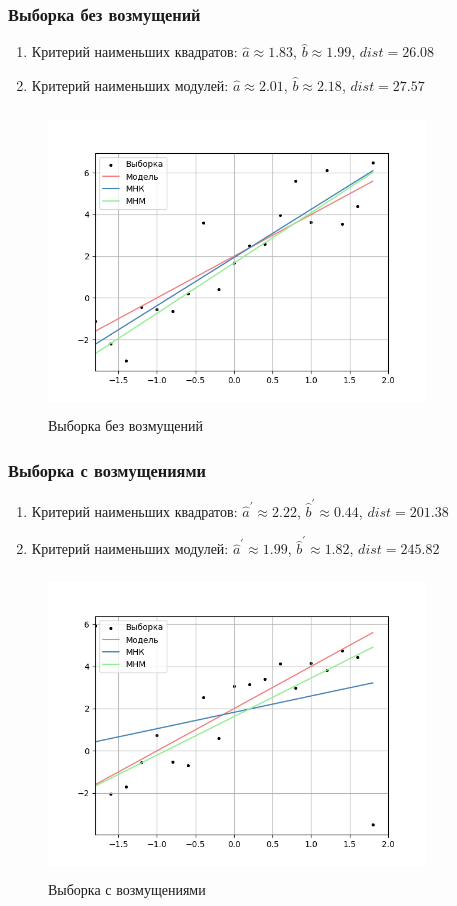\documentclass[main.tex]{subfiles}
\begin{document}
\subsubsection{Выборка без возмущений}
\begin{enumerate}
	\item{Критерий наименьших квадратов:}
	$\hat{a}\approx 1.83$, $\hat{b}\approx 1.99$, $dist = 26.08$
	\item{Критерий наименьших модулей:}
	$\hat{a}\approx 2.01$, $\hat{b}\approx 2.18$, $dist = 27.57$
\end{enumerate}
\begin{figure}[ht]
	\centering
	\includegraphics[width = 10cm, height = 8cm]{../images/regression/6_1.png}
	\caption{Выборка без возмущений}
	\label{w/o_pert}
\end{figure}

\FloatBarrier
\subsubsection{Выборка с возмущениями}
\begin{enumerate}
	\item{Критерий наименьших квадратов:}
	$\hat{a}^\prime \approx 2.22$, $\hat{b}^\prime \approx 0.44$, $dist = 201.38$
	\item{Критерий наименьших модулей:}
	$\hat{a}^\prime \approx 1.99$, $\hat{b}^\prime \approx 1.82$, $dist = 245.82$
\end{enumerate}
\begin{figure}
	\centering
	\includegraphics[width = 10cm, height = 8cm]{../images/regression/6_2.png}
	\caption{Выборка с возмущениями}
	\label{w_pert}
\end{figure}
\end{document}
